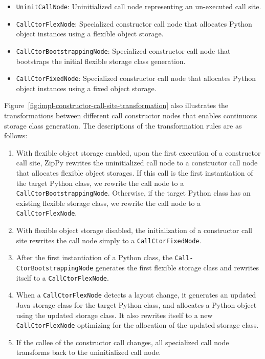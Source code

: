 \begin{itemize}

\item \texttt{UninitCallNode}: Uninitialized call node representing an un-executed call site.

\item \texttt{CallCtorFlexNode}: Specialized constructor call node that allocates Python object instances using a flexible object storage.

\item \texttt{CallCtorBootstrappingNode}: Specialized constructor call node that bootstraps the initial flexible storage class generation.

\item \texttt{CallCtorFixedNode}: Specialized constructor call node that allocates Python object instances using a fixed object storage.

\end{itemize}

Figure~\ref{fig:impl-constructor-call-site-transformation} also illustrates the transformations between different call constructor nodes that enables continuous storage class generation.
The descriptions of the transformation rules are as follows:

\begin{enumerate}

\item With flexible object storage enabled, upon the first execution of a constructor call site, ZipPy rewrites the uninitialized call node to a constructor call node that allocates flexible object storages.
If this call is the first instantiation of the target Python class, we rewrite the call node to a \texttt{CallCtorBootstrappingNode}.
Otherwise, if the target Python class has an existing flexible storage class, we rewrite the call node to a \texttt{CallCtorFlexNode}.

\item With flexible object storage disabled, the initialization of a constructor call site rewrites the call node simply to a \texttt{CallCtorFixedNode}.

\item After the first instantiation of a Python class, the \texttt{Call-\\CtorBootstrappingNode} generates the first flexible storage class and rewrites itself to a \texttt{CallCtorFlexNode}.

\item When a \texttt{CallCtorFlexNode} detects a layout change, it generates an updated Java storage class for the target Python class, and allocates a Python object using the updated storage class.
It also rewrites itself to a new \texttt{CallCtorFlexNode} optimizing for the allocation of the updated storage class.

\item If the callee of the constructor call changes, all specialized call node transforms back to the uninitialized call node.

\end{enumerate}

